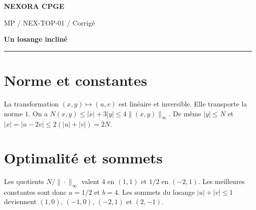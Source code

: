 \documentclass[11pt,a4paper]{article}
\begin{document}
{\small\bfseries\color{nexorablue} NEXORA CPGE}\par
{\small MP / NEX-TOP-01 / Corrigé}\par
{\LARGE\bfseries Un losange incliné}\par
\vspace{0.25em}\hrule\vspace{0.6em}

\section*{Norme et constantes}
La transformation $(x,y)\mapsto(u,v)$ est linéaire et inversible. Elle transporte la norme $1$. On a $N(x,y)\le |x|+3|y|\le4\|(x,y)\|_\infty$. De même $|y|\le N$ et $|x|=|u-2v|\le2(|u|+|v|)=2N$.

\section*{Optimalité et sommets}
Les quotients $N/\|\cdot\|_\infty$ valent $4$ en $(1,1)$ et $1/2$ en $(-2,1)$. Les meilleures constantes sont donc $a=1/2$ et $b=4$. Les sommets du losange $|u|+|v|\le1$ deviennent $(1,0)$, $(-1,0)$, $(-2,1)$ et $(2,-1)$.
\end{document}
